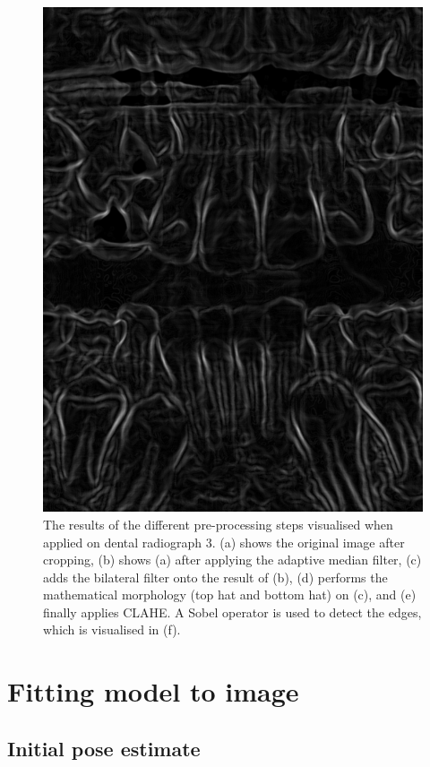 \documentclass[a4paper,titlepage,12pt]{article}
\begin{document}
\begin{figure}
\begin{minipage}[b]{0.32\linewidth}
		\includegraphics[width=\linewidth]{preprocess/gradients.png}
	\end{minipage}
  \caption{
		The results of the different pre-processing steps visualised when applied on dental radiograph 3.
		(a) shows the original image after cropping, (b) shows (a) after applying the adaptive median filter, (c) adds the bilateral filter onto the result of (b), (d) performs the mathematical morphology (top hat and bottom hat) on (c), and (e) finally applies CLAHE. A Sobel operator is used to detect the edges, which is visualised in (f).} \label{preprocess}
\end{figure}


\section{Fitting model to image}


\subsection{Initial pose estimate}
\end{document}
